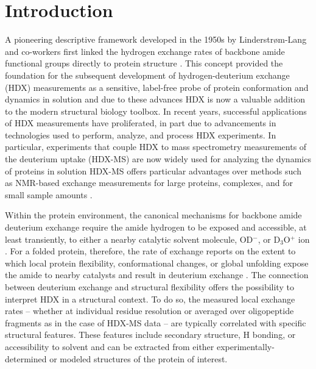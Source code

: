 \documentclass[9pt,tutorial,ASAPversion]{livecoms}
\begin{document}
\section{Introduction}
A pioneering descriptive framework developed in the 1950s by Linderstrøm-Lang and co-workers first linked the hydrogen exchange rates of backbone amide functional groups directly to protein structure  \cite{Hvidt1954, Englander1997}. 
This concept provided the foundation for the subsequent development of hydrogen-deuterium exchange (HDX) measurements as a sensitive, label-free probe of protein conformation and dynamics in solution and due to these advances HDX is now a valuable addition to the modern structural biology toolbox. 
In recent years, successful applications of HDX measurements have proliferated, in part due to advancements in technologies used to perform, analyze, and process HDX experiments. 
In particular, experiments that couple HDX to mass spectrometry measurements of the deuterium uptake (HDX-MS) are now widely used for analyzing the dynamics of proteins in solution
HDX-MS offers particular advantages over methods such as NMR-based exchange measurements for large proteins, complexes, and for small sample amounts \cite{Oganesyan2018, Engen2020, James2021}.

Within the protein environment, the canonical mechanisms for backbone amide deuterium exchange require the amide hydrogen to be exposed and accessible, at least transiently, to either a nearby catalytic solvent molecule, OD$^-$, or D$_3$O$^+$ ion \cite{Hvidt1966, Englander1983}. 
For a folded protein, therefore, the rate of exchange reports on the extent to which local protein flexibility, conformational changes, or global unfolding expose the amide to nearby catalysts and result in deuterium exchange \cite{Hvidt1966, Englander1997, Englander1983, Oganesyan2018}.
The connection between deuterium exchange and structural flexibility offers the possibility to interpret HDX in a structural context.
To do so, the measured local exchange rates -- whether at individual residue resolution or averaged over oligopeptide fragments as in the case of HDX-MS data -- are typically correlated with specific structural features. 
These features include secondary structure, H bonding, or accessibility to solvent and can be extracted from either experimentally-determined or modeled structures of the protein of interest.
\end{document}
